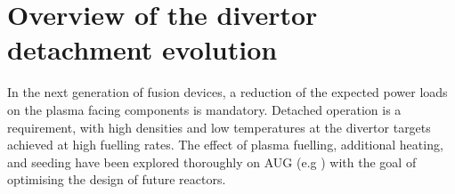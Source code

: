 \documentclass[12pt]{iopart}
\begin{document}



\section{Overview of the divertor detachment evolution}
\label{section:overviewdivdetevol}

In the next generation of fusion devices, a reduction of the expected power loads on the plasma facing components is mandatory. Detached operation is a requirement, with high densities and low temperatures at the divertor targets achieved at high fuelling rates. The effect of plasma fuelling, additional heating, and seeding have been explored thoroughly on AUG (e.g \cite{kallenbach2018parameter,Potzel2015a,Bernert2013a}) with the goal of optimising the design of future reactors.
\end{document}

